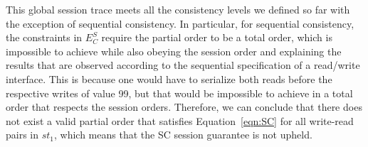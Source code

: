 \documentclass[journal,compsoc]{IEEEtran}
\begin{document}
 This global session trace meets all the consistency levels we defined so far with the exception of sequential consistency.
 In particular, for sequential consistency, the constraints in $E^S_C$ require the partial order to be a total order, which is impossible to achieve while also obeying the session order and explaining the results that are observed according to the sequential specification of a read/write interface. This is because one would have to serialize both reads before the respective writes of value 99, but that would be impossible to achieve in a total order that respects the session orders.
  Therefore, we can conclude that there does not exist a valid partial order that satisfies Equation~\ref{eqn:SC} for all write-read pairs in $\mathit{st}_1$, which means that the SC session guarantee is not upheld.
\end{document}
